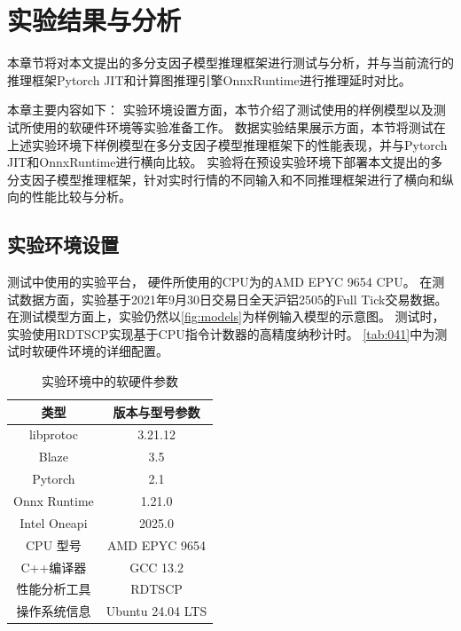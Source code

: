 \chapter{实验结果与分析}
\label{cha:04}

本章节将对本文提出的多分支因子模型推理框架进行测试与分析，并与当前流行的推理框架Pytorch JIT和计算图推理引擎OnnxRuntime进行推理延时对比。

本章主要内容如下： 
实验环境设置方面，本节介绍了测试使用的样例模型以及测试所使用的软硬件环境等实验准备工作。
数据实验结果展示方面，本节将测试在上述实验环境下样例模型在多分支因子模型推理框架下的性能表现，并与Pytorch JIT\cite{paszke2019pytorchimperativestylehighperformance}和OnnxRuntime进行横向比较。
实验将在预设实验环境下部署本文提出的多分支因子模型推理框架，针对实时行情的不同输入和不同推理框架进行了横向和纵向的性能比较与分析。

\section{实验环境设置}
\label{cha:041}
测试中使用的实验平台， 硬件所使用的CPU为的AMD EPYC 9654 CPU。
在测试数据方面，实验基于2021年9月30日交易日全天沪铝2505的Full Tick交易数据。
在测试模型方面上，实验仍然以\autoref{fig:models}为样例输入模型的示意图。
测试时，实验使用RDTSCP实现基于CPU指令计数器的高精度纳秒计时。 
\autoref{tab:041}中为测试时软硬件环境的详细配置。

\begin{table}[h] %
    \centering
    \caption{实验环境中的软硬件参数}
    \begin{tabular}{|c|c|}
        \toprule
        \textbf{类型} & \textbf{版本与型号参数} \\
        \midrule
        libprotoc & 3.21.12\\
        \midrule
        Blaze & 3.5\\
        \midrule
        Pytorch & 2.1\\
        \midrule
        Onnx Runtime & 1.21.0\\
        \midrule
        Intel Oneapi & 2025.0\\
        \midrule
        CPU 型号 & AMD EPYC 9654  \\
        \midrule
        C++编译器 & GCC 13.2\\
        \midrule
        性能分析工具 & RDTSCP\\
        \midrule
        操作系统信息 & Ubuntu 24.04 LTS \\
        \bottomrule
    \end{tabular}
    \label{tab:041}
\end{table}

